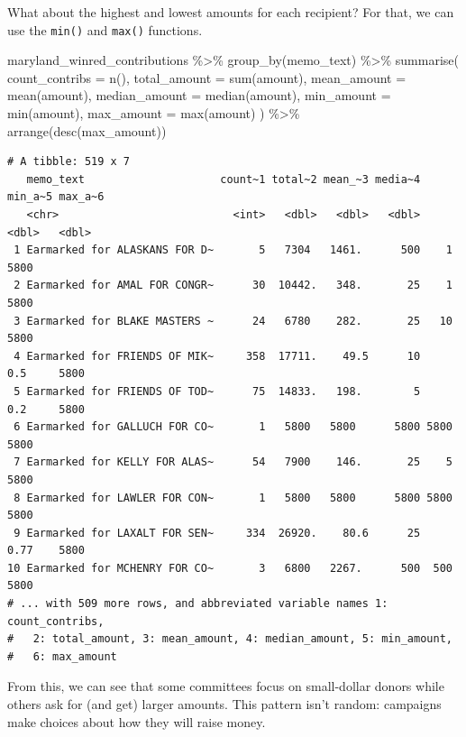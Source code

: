 \documentclass[
  letterpaper,
  DIV=11,
  numbers=noendperiod]{scrreprt}
\newenvironment{Shaded}{\begin{snugshade}}{\end{snugshade}}
\newcommand{\AttributeTok}[1]{\textcolor[rgb]{0.40,0.45,0.13}{#1}}
\newcommand{\FunctionTok}[1]{\textcolor[rgb]{0.28,0.35,0.67}{#1}}
\newcommand{\NormalTok}[1]{\textcolor[rgb]{0.00,0.23,0.31}{#1}}
\newcommand{\SpecialCharTok}[1]{\textcolor[rgb]{0.37,0.37,0.37}{#1}}
\begin{document}
What about the highest and lowest amounts for each recipient? For that,
we can use the \texttt{min()} and \texttt{max()} functions.

\begin{Shaded}
\begin{Highlighting}[]
\NormalTok{maryland\_winred\_contributions }\SpecialCharTok{\%\textgreater{}\%}
  \FunctionTok{group\_by}\NormalTok{(memo\_text) }\SpecialCharTok{\%\textgreater{}\%}
  \FunctionTok{summarise}\NormalTok{(}
    \AttributeTok{count\_contribs =} \FunctionTok{n}\NormalTok{(),}
    \AttributeTok{total\_amount =} \FunctionTok{sum}\NormalTok{(amount),}
    \AttributeTok{mean\_amount =} \FunctionTok{mean}\NormalTok{(amount),}
    \AttributeTok{median\_amount =} \FunctionTok{median}\NormalTok{(amount),}
    \AttributeTok{min\_amount =} \FunctionTok{min}\NormalTok{(amount),}
    \AttributeTok{max\_amount =} \FunctionTok{max}\NormalTok{(amount)}
\NormalTok{  ) }\SpecialCharTok{\%\textgreater{}\%}
  \FunctionTok{arrange}\NormalTok{(}\FunctionTok{desc}\NormalTok{(max\_amount))}
\end{Highlighting}
\end{Shaded}

\begin{verbatim}
# A tibble: 519 x 7
   memo_text                     count~1 total~2 mean_~3 media~4 min_a~5 max_a~6
   <chr>                           <int>   <dbl>   <dbl>   <dbl>   <dbl>   <dbl>
 1 Earmarked for ALASKANS FOR D~       5   7304   1461.      500    1       5800
 2 Earmarked for AMAL FOR CONGR~      30  10442.   348.       25    1       5800
 3 Earmarked for BLAKE MASTERS ~      24   6780    282.       25   10       5800
 4 Earmarked for FRIENDS OF MIK~     358  17711.    49.5      10    0.5     5800
 5 Earmarked for FRIENDS OF TOD~      75  14833.   198.        5    0.2     5800
 6 Earmarked for GALLUCH FOR CO~       1   5800   5800      5800 5800       5800
 7 Earmarked for KELLY FOR ALAS~      54   7900    146.       25    5       5800
 8 Earmarked for LAWLER FOR CON~       1   5800   5800      5800 5800       5800
 9 Earmarked for LAXALT FOR SEN~     334  26920.    80.6      25    0.77    5800
10 Earmarked for MCHENRY FOR CO~       3   6800   2267.      500  500       5800
# ... with 509 more rows, and abbreviated variable names 1: count_contribs,
#   2: total_amount, 3: mean_amount, 4: median_amount, 5: min_amount,
#   6: max_amount
\end{verbatim}

From this, we can see that some committees focus on small-dollar donors
while others ask for (and get) larger amounts. This pattern isn't
random: campaigns make choices about how they will raise money.
\end{document}
